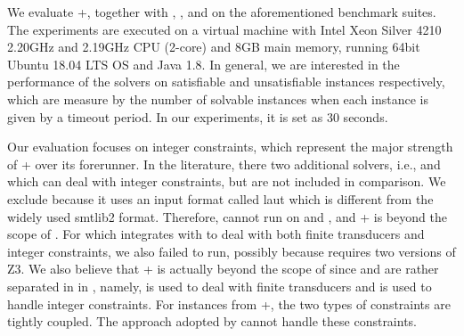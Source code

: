 We evaluate {\ostrich}+, together with {\cvc} \cite{cvc4}, {\zthree} \cite{Z3-str}, and {\zthreetrau} \cite{Z3-trau} on the aforementioned benchmark suites. 
The experiments are executed on a virtual machine with Intel Xeon Silver 4210 2.20GHz and 2.19GHz CPU (2-core) and 8GB main memory, running 64bit Ubuntu 18.04 LTS OS and Java 1.8. In general, we are interested in the performance of the solvers on satisfiable and unsatisfiable instances respectively, which are measure by the number of solvable instances  when each instance is given by a timeout period. In our experiments, it is set as 30 seconds. %

Our evaluation focuses on integer constraints, which represent the major strength of {\ostrich}+ over its forerunner. In the literature, there two additional solvers, i.e., {\slent} and  {\trauplus} which can deal with integer constraints, but are not included in comparison.  We exclude {\slent} because it uses an input format called laut which is different from the widely used smtlib2 format. Therefore, %
{\slent} cannot run on {\kaluzabench} and {\pyexbench}, and {\transducerbench}+ is beyond the scope of {\slent}.  
%
For {\trauplus} which integrates {\trau} with {\sloth} to deal with both finite transducers and integer constraints, we also failed to run, possibly because {\trau} requires two versions of Z3.  We also believe that {\transducerbench}+ is actually beyond the scope of {\trauplus} since   {\trau} and {\sloth} are rather separated in in {\trauplus}, namely, {\sloth} is used to deal with finite transducers and {\trau} is used to handle integer constraints. For instances from {\transducerbench}+, the two types of constraints are tightly coupled. The approach adopted by {\trauplus} cannot handle these constraints. %


